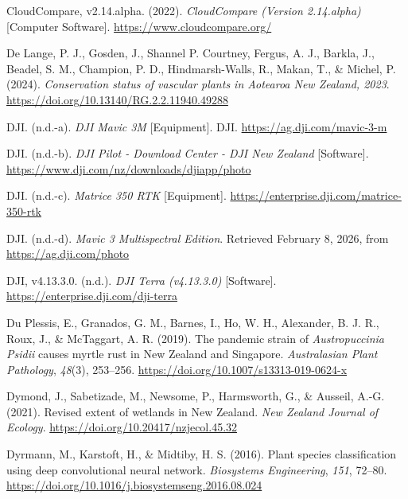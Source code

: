 \documentclass[
]{scrreprt}
\newlength{\cslhangindent}
\newenvironment{CSLReferences}[2] %
 {\begin{list}{}{%
  \setlength{\itemindent}{0pt}
  \setlength{\leftmargin}{0pt}
  \setlength{\parsep}{0pt}
  \setlength{\baselineskip}{12pt}
  \ifodd #1
   \setlength{\leftmargin}{\cslhangindent}
   \setlength{\itemindent}{-1\cslhangindent}
  \fi
  \setlength{\itemsep}{4pt}}}
 {\end{list}}
\begin{document}
\begin{CSLReferences}{1}{0}
CloudCompare, v2.14.alpha. (2022). \emph{{CloudCompare} ({Version}
2.14.alpha)} {[}Computer Software{]}.
\url{https://www.cloudcompare.org/}

De Lange, P. J., Gosden, J., Shannel P. Courtney, Fergus, A. J., Barkla,
J., Beadel, S. M., Champion, P. D., Hindmarsh-Walls, R., Makan, T., \&
Michel, P. (2024). \emph{Conservation status of vascular plants in
{Aotearoa New Zealand}, 2023}.
\url{https://doi.org/10.13140/RG.2.2.11940.49288}

DJI. (n.d.-a). \emph{{DJI Mavic 3M}} {[}Equipment{]}. DJI.
\url{https://ag.dji.com/mavic-3-m}

DJI. (n.d.-b). \emph{{DJI Pilot} - {Download Center} - {DJI New
Zealand}} {[}Software{]}.
\url{https://www.dji.com/nz/downloads/djiapp/photo}

DJI. (n.d.-c). \emph{Matrice 350 {RTK}} {[}Equipment{]}.
\url{https://enterprise.dji.com/matrice-350-rtk}

DJI. (n.d.-d). \emph{Mavic 3 {Multispectral Edition}}. Retrieved
February 8, 2026, from \url{https://ag.dji.com/photo}

DJI, v4.13.3.0. (n.d.). \emph{{DJI Terra} (v4.13.3.0)} {[}Software{]}.
\url{https://enterprise.dji.com/dji-terra}

Du Plessis, E., Granados, G. M., Barnes, I., Ho, W. H., Alexander, B. J.
R., Roux, J., \& McTaggart, A. R. (2019). The pandemic strain of
{\emph{Austropuccinia}}{ \emph{Psidii}} causes myrtle rust in {New
Zealand} and {Singapore}. \emph{Australasian Plant Pathology},
\emph{48}(3), 253--256. \url{https://doi.org/10.1007/s13313-019-0624-x}

Dymond, J., Sabetizade, M., Newsome, P., Harmsworth, G., \& Ausseil,
A.-G. (2021). Revised extent of wetlands in {New Zealand}. \emph{New
Zealand Journal of Ecology}.
\url{https://doi.org/10.20417/nzjecol.45.32}

Dyrmann, M., Karstoft, H., \& Midtiby, H. S. (2016). Plant species
classification using deep convolutional neural network. \emph{Biosystems
Engineering}, \emph{151}, 72--80.
\url{https://doi.org/10.1016/j.biosystemseng.2016.08.024}


\end{CSLReferences}
\end{document}

